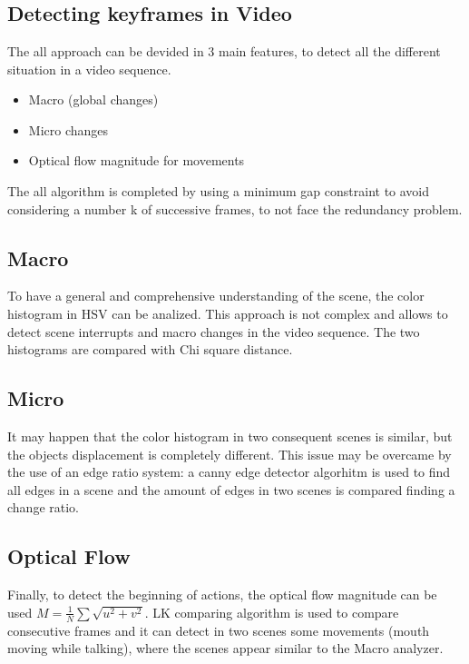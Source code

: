 
\section[Question -- {\it Detecting keyframes in Video}]{}

\subsection{Detecting keyframes in Video}
The all approach can be devided in 3 main features, to detect all the different situation in a video sequence.
\begin{itemize}
    \item Macro (global changes)
    \item Micro changes
    \item Optical flow magnitude for movements 
\end{itemize}

The all algorithm is completed by using a minimum gap constraint to avoid considering a number k of successive frames, 
to not face the redundancy problem.

\subsection{Macro}
To have a general and comprehensive understanding of the scene, the color histogram in HSV can be analized. This approach
is not complex and allows to detect scene interrupts and macro changes in the video sequence. The two histograms are compared
with Chi square distance.

\subsection{Micro}
It may happen that the color histogram in two consequent scenes is similar, but the objects displacement is completely different.
This issue may be overcame by the use of an edge ratio system: a canny edge detector algorhitm is used to find all edges in a scene
and the amount of edges in two scenes is compared finding a change ratio.

\subsection{Optical Flow}
Finally, to detect the beginning of actions, the optical flow magnitude can be used $M = \frac{1}{N}\sum \sqrt{u^2 + v^2}$. 
LK comparing algorithm is used to compare consecutive frames and it can detect in two scenes some movements (mouth moving 
while talking), where the scenes appear similar to the Macro analyzer.


